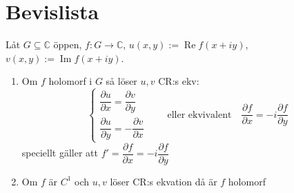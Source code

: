 \section{Bevislista}
\begin{theorem}
Låt $G \subseteq \mathbb{C}$ öppen, $f : G \to \mathbb{C}$, $u(x, y) := \operatorname{Re} f(x + iy)$, $v(x, y) := \operatorname{Im} f(x + iy)$.
\begin{enumerate}[label=\alph*)]
  \item Om $f$ holomorf i $G$ så löser $u, v$ CR:s ekv:
  \[ \begin{cases} \dfrac{\partial u}{\partial x} = \dfrac{\partial v}{\partial y} \\[1em] \dfrac{\partial u}{\partial y} = -\dfrac{\partial v}{\partial x} \end{cases} \qquad \text{eller ekvivalent} \quad \frac{\partial f}{\partial x} = -i\frac{\partial f}{\partial y} \]
  speciellt gäller att $f' = \dfrac{\partial f}{\partial x} = -i\dfrac{\partial f}{\partial y}$
  \item Om $f$ är $C^1$ och $u, v$ löser CR:s ekvation då är $f$ holomorf
\end{enumerate}
\end{theorem}
